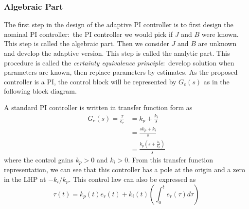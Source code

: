 \subsubsection{Algebraic Part}

The first step in the design of the adaptive PI controller is to first design the nominal PI controller:\ the PI controller we would pick if $J$ and $B$ were known.
This step is called the algebraic part.
Then we consider $J$ and $B$ are unknown and develop the adaptive version.
This step is called the analytic part.
This procedure is called the \textit{certainty equivalence principle}:\ develop solution when parameters are known, then replace parameters by estimates.
As the proposed controller is a PI, the control block will be represented by $G_{c}(s)$ as in the following block diagram.

\begin{figure}[H]
  \begin{center}
  \end{center}
\end{figure}

\noindent A standard PI controller is written in transfer function form as
\begin{align*}
  G_{c}(s)=\frac{\tau}{e_{r}}&=k_{p}+\frac{k_{i}}{s} \\
  &=\frac{sk_{p}+k_{i}}{s} \\
  &=\frac{k_{p}\left(s+\frac{k_{i}}{k_{p}}\right)}{s}
\end{align*}
where the control gains $k_{p}>0$ and $k_{i}>0$.
From this transfer function representation, we can see that this controller has a pole at the origin and a zero in the LHP at $-k_{i}/k_{p}$.
This control law can also be expressed as
\begin{equation*}
  \tau(t)=k_{p}(t)e_{r}(t)+k_{i}(t)\left(\int_{0}^{t}e_{r}(\tau)d\tau\right)
\end{equation*}

